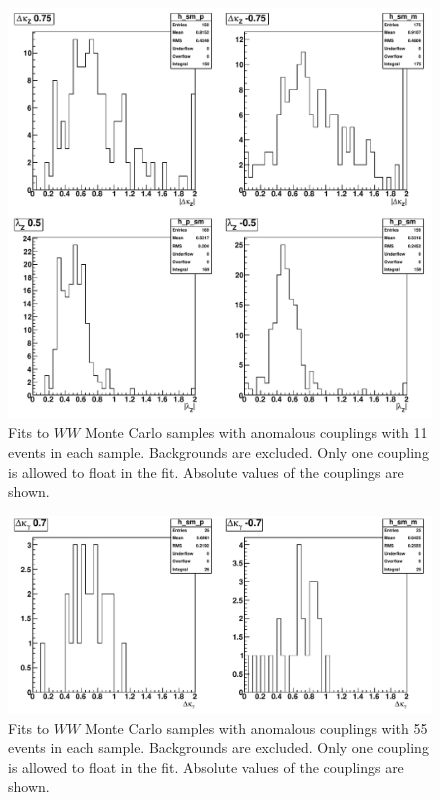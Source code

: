 \begin{figure}[tp]
  \centerline{
    \includegraphics[width=1.0\textwidth]{figures/fit_wwATGC_mc_1D_abs}
  }

  \caption[1D fits to WW aTGC Monte Carlo] {Fits to $WW$ Monte Carlo
    samples with anomalous couplings with 11 events in each sample. Backgrounds
    are excluded. Only one coupling is allowed to float in the fit. Absolute
    values of the couplings are shown.}
  \label{fig:fit_wwATGC_mc_1D_abs}
\end{figure}

\begin{figure}[tp]
  \centerline{
    \includegraphics[width=1.0\textwidth]{figures/fit_wwATGC_mc_1D_abs2}
  }

  \caption[1D fits to WW aTGC Monte Carlo] {Fits to $WW$ Monte Carlo
    samples with anomalous couplings with 55 events in each sample. Backgrounds
    are excluded. Only one coupling is allowed to float in the fit. Absolute
    values of the couplings are shown.}
  \label{fig:fit_wwATGC_mc_1D_abs2}
\end{figure}
